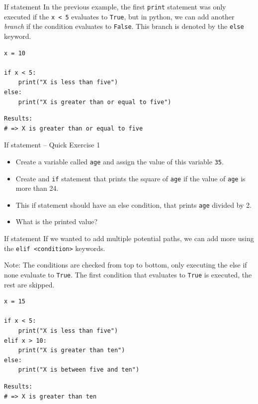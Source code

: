 \documentclass[10pt]{beamer}
\begin{document}
\begin{frame}[label={sec:org356348d},fragile]{If statement}
 In the previous example, the first \texttt{print} statement was only executed if the \texttt{x < 5}
evaluates to \texttt{True}, but in python, we can add another \emph{branch} if the condition
evaluates to \texttt{False}. This branch is denoted by the \texttt{else} keyword.

\begin{verbatim}
x = 10

if x < 5:
    print("X is less than five")
else:
    print("X is greater than or equal to five")
\end{verbatim}

\begin{verbatim}
Results: 
# => X is greater than or equal to five
\end{verbatim}
\end{frame}

\begin{frame}[label={sec:org63660ae},fragile]{If statement -- Quick Exercise 1}
 \begin{itemize}
\item Create a variable called \texttt{age} and assign the value of this variable \texttt{35}.
\item Create and \texttt{if} statement that prints the square of \texttt{age} if the value of \texttt{age} is more
than 24.
\item This if statement should have an else condition, that prints \texttt{age} divided by 2.
\item What is the printed value?
\end{itemize}
\end{frame}

\begin{frame}[label={sec:org85ce4c4},fragile]{If statement}
 If we wanted to add multiple potential paths, we can add more using the \texttt{elif
<condition>} keywords.

Note: The conditions are checked from top to bottom, only executing the else if none
evaluate to \texttt{True}. The first condition that evaluates to \texttt{True} is executed, the rest
are skipped.

\begin{verbatim}
x = 15

if x < 5:
    print("X is less than five")
elif x > 10:
    print("X is greater than ten")
else:
    print("X is between five and ten")
\end{verbatim}

\begin{verbatim}
Results: 
# => X is greater than ten
\end{verbatim}
\end{frame}
\end{document}
